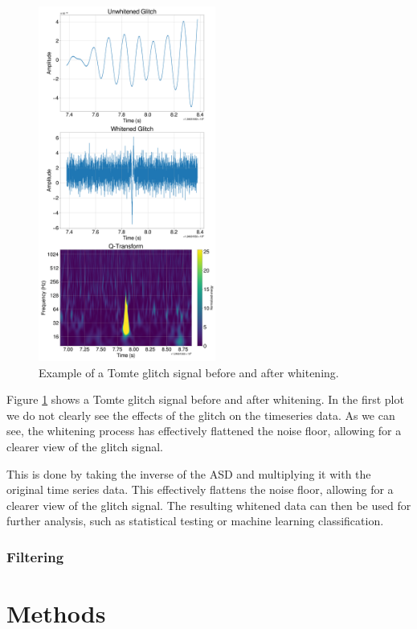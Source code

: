 \documentclass[12pt]{article}
\begin{document}
\begin{figure}[H]
  \centering
  \includegraphics[width=0.52\textwidth]{images/sample_plot.pdf}
  \caption{Example of a Tomte glitch signal before and after whitening.}
  \label{fig:sampletomte}
\end{figure}

\medskip
\noindent Figure \ref{fig:sampletomte} shows a Tomte glitch signal before and after whitening. In the first plot we do not clearly see the effects of the glitch on the timeseries data. As we can see, the whitening process has effectively flattened the noise floor, allowing for a clearer view of the glitch signal.

\noindent This is done by taking the inverse of the ASD and multiplying it with the original time series data. This effectively flattens the noise floor, allowing for a clearer view of the glitch signal. The resulting whitened data can then be used for further analysis, such as statistical testing or machine learning classification.

\subsubsection{Filtering}

\section{Methods}\label{Methods}
\end{document}
